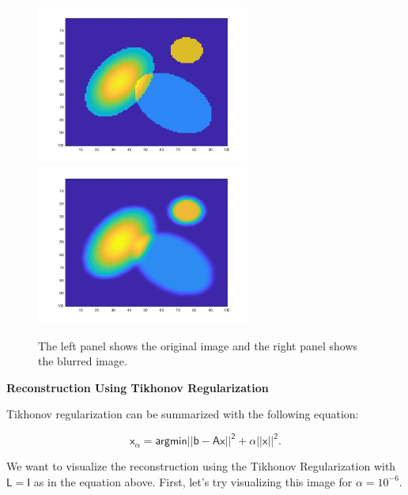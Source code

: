\documentclass{article}
\begin{document}
\begin{figure}[H]
\centerline{
\includegraphics[width = 7cm]{TrueTarget.png} \includegraphics[width = 7cm]{blurredTarget.png}
}
\caption{\label{fig:Figure 3} The left panel shows the original image and the right panel shows the blurred image.}
\end{figure}

\bigskip
{\Large {\bf Reconstruction Using Tikhonov Regularization}}
\bigskip

Tikhonov regularization can be summarized with the following equation:

\[
\mathsf{x_{\alpha} = argmin{||b - Ax||^2 + \alpha||x||^2}}.
\]

We want to visualize the reconstruction using the Tikhonov Regularization with $\mathsf{L = I}$ as in the equation above. First, let's try visualizing this image for $\mathsf{\alpha} = 10^{-6}$.
\end{document}
